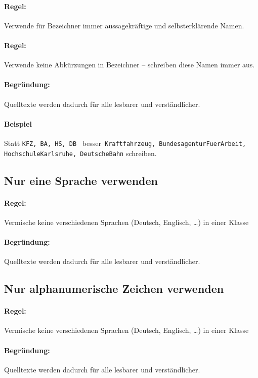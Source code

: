 \paragraph{Regel:} Verwende für Bezeichner immer aussagekräftige und selbsterklärende Namen.
\paragraph{Regel:} Verwende keine Abkürzungen in Bezeichner – schreiben diese Namen immer aus.
\paragraph{Begründung:} Quelltexte werden dadurch für alle lesbarer und verständlicher.

\paragraph{Beispiel}
Statt \texttt{KFZ, BA, HS, DB} \ besser\  \texttt{Kraftfahrzeug, BundesagenturFuerArbeit, HochschuleKarlsruhe, DeutscheBahn} schreiben.

\subsection{Nur eine Sprache verwenden}

\paragraph{Regel:} Vermische keine verschiedenen Sprachen (Deutsch, Englisch, …) in einer Klasse
\paragraph{Begründung:} Quelltexte werden dadurch für alle lesbarer und verständlicher.

\subsection{Nur alphanumerische Zeichen verwenden}

\paragraph{Regel:} Vermische keine verschiedenen Sprachen (Deutsch, Englisch, …) in einer Klasse
\paragraph{Begründung:} Quelltexte werden dadurch für alle lesbarer und verständlicher.

